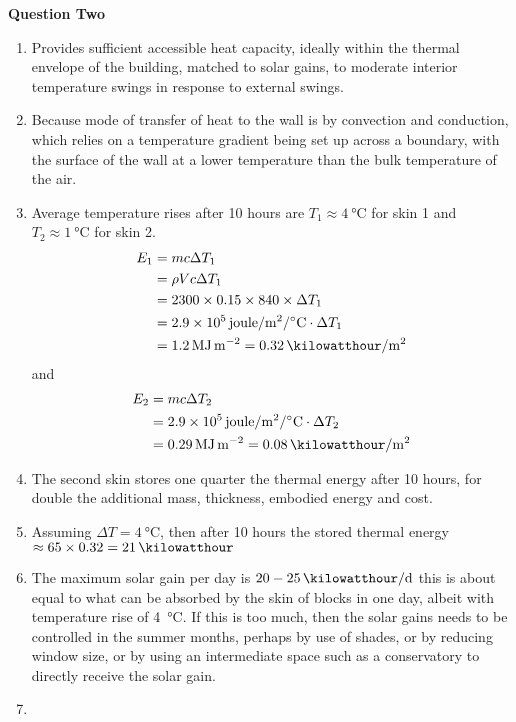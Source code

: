 \documentclass[a4paper,12pt,fleqn]{article}
\begin{document}
\textbf{Question Two}
\begin{enumerate}[label=\alph*)]
\item Provides sufficient accessible heat capacity, ideally within the thermal envelope of the building, matched to solar gains, to moderate interior temperature swings in response to external swings.
\item Because mode of transfer of heat to the wall is by convection and conduction, which relies on a temperature gradient being set up  across a boundary, with the surface of the wall at a lower temperature than the bulk temperature of the air.
\item Average temperature rises after 10 hours are $T_1 \approx \SI{4}{\celsius}$ for skin 1 and $T_2 \approx \SI{1}{\celsius}$ for skin 2.
\begin{align*}
E_1 &=mc\Delta T_1\\
&=\rho V c \Delta T_1\\
&=2300\times 0.15\times 840\times \Delta T_1\\
&=\SI{2.9e5}{joule\per\metre\squared\per\celsius}\cdot \Delta T_1\\
&=\SI{1.2}{\mega\joule\per\metre\squared}=\SI{0.32}{\kilowatthour\per\metre\squared}
\end{align*}
and
\begin{align*}
E_2 &=mc\Delta T_2\\
&=\SI{2.9e5}{joule\per\metre\squared\per\celsius}\cdot \Delta T_2\\
&=\SI{0.29}{\mega\joule\per\metre\squared}=\SI{0.08}{\kilowatthour\per\metre\squared}
\end{align*}
\item The second skin stores one quarter the thermal energy after 10 hours, for double the additional mass, thickness, embodied energy and cost.
\item Assuming $\Delta T=\SI{4}{\celsius}$, then after 10 hours the stored thermal energy $\approx 65\times 0.32=\SI{21}{\kilowatthour}$
\item The maximum solar gain per day is $20-\SI{25}{\kilowatthour\per\day}$ this is about equal to what can be absorbed by the skin of blocks in one day, albeit with temperature rise of \SI{4}{\celsius}. If this is too much, then the solar gains needs to be controlled in the summer months, perhaps by use of shades, or by reducing window size, or by using an intermediate space such as a conservatory to directly receive the solar gain.
\item 
\end{enumerate}
\end{document}

